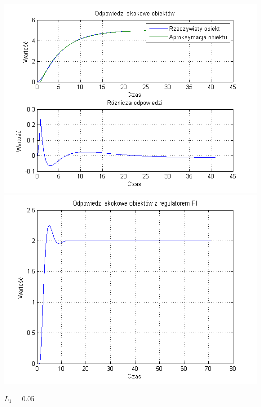 \documentclass[10pt,a4paper]{article}
\begin{document}
\begin{center}
\includegraphics[scale=1]{images/jeden/skrypt_191.png}\\
\includegraphics[scale=1]{images/jeden/skrypt_192.png}\\
\end{center}
\newpage
$L_1$ = 0.05
\end{document}
